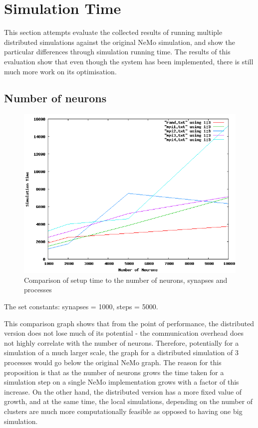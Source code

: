 \section{Simulation Time}

This section attempts evaluate the collected results of running multiple distributed simulations against the original NeMo simulation, and show the particular differences through simulation running time. The results of this evaluation show that even though the system has been implemented, there is still much more work on its optimisation.

\subsection{Number of neurons}

\begin{figure}[h!]
\begin{center}
\includegraphics[scale = 0.4]{images/evaluation/distributed_neurons.png}
\end{center}
\caption{Comparison of setup time to the number of neurons, synapses and processes}
\end{figure}

The set constants: synapses = 1000, steps = 5000.

This comparison graph shows that from the point of performance, the distributed version does not lose much of its potential - the communication overhead does not highly correlate with the number of neurons. Therefore, potentially for a simulation of a much larger scale, the graph for a distributed simulation of 3 processes would go below the original NeMo graph. The reason for this proposition is that as the number of neurons grows the time taken for a simulation step on a single NeMo implementation grows with a factor of this increase. On the other hand, the distributed version has a more fixed value of growth, and at the same time, the local simulations, depending on the number of clusters are much more computationally feasible as opposed to having one big simulation.

